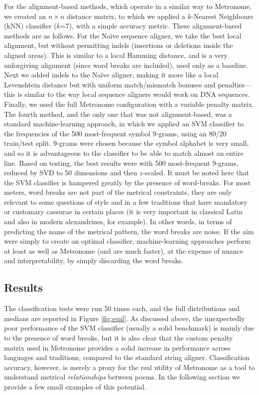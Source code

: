 \documentclass[
    hf
]{ceurart}
\begin{document}
For the alignment-based methods, which operate in a similar way to Metronome, we created an $n \times n$ distance matrix, to which we applied a $k$-Nearest Neighbours (kNN) classifier ($k$=7), with a simple accuracy metric. These alignment-based methods are as follows. For the Naïve sequence aligner, we take the best local alignment, but without permitting indels (insertions or deletions inside the aligned areas). This is similar to a local Hamming distance, and is a very unforgiving alignment (since word breaks are included), used only as a baseline. Next we added indels to the Naïve aligner, making it more like a local Levenshtein distance but with uniform match/mismatch bonuses and penalties---this is similar to the way local sequence aligners would work on DNA sequences. Finally, we used the full Metronome configuration with a variable penalty matrix. The fourth method, and the only one that was not alignment-based, was a standard machine-learning approach, in which we applied an SVM classifier to the frequencies of the 500 most-frequent symbol 9-grams, using an 80/20 train/test split. 9-grams were chosen because the symbol alphabet is very small, and so it is advantageous to the classifier to be able to match almost an entire line. Based on testing, the best results were with 500 most-frequent 9-grams, reduced by SVD to 50 dimensions and then $z$-scaled. It must be noted here that the SVM classifier is hampered greatly by the presence of word-breaks. For most meters, word breaks are not part of the metrical constraints, they are only relevant to some questions of style and in a few traditions that have mandatory or customary caesurae in certain places (it is very important in classical Latin and also in modern alexandrines, for example). In other words, in terms of predicting the name of the metrical pattern, the word breaks are noise. If the aim were simply to create an optimal classifier, machine-learning approaches perform at least as well as Metronome (and are much faster), at the expense of nuance and interpretability, by simply discarding the word breaks.

\subsection{Results}

The classification tests were run 50 times each, and the full distributions and medians are reported in Figure \ref{fig:eval}. As discussed above, the unexpectedly poor performance of the SVM classifier (usually a solid benchmark) is mainly due to the presence of word breaks, but it is also clear that the custom penalty matrix used in Metronome provides a solid increase in performance across languages and traditions, compared to the standard string aligner. Classification accuracy, however, is merely a proxy for the real utility of Metronome as a tool to understand metrical \textit{relationships} between poems. In the following section we provide a few small examples of this potential.
\end{document}
